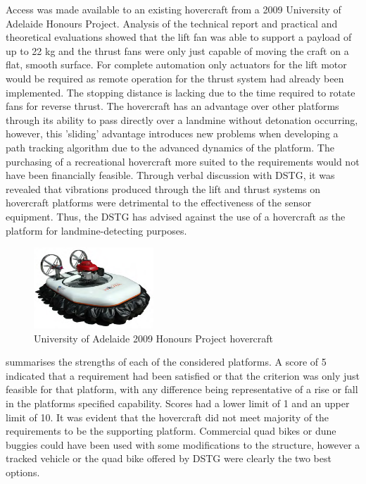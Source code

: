 \documentclass[main.tex]{subfiles}
\begin{document}
Access was made available to an existing hovercraft from a 2009 University of Adelaide Honours Project. Analysis of the technical report \parencite{hovercraft2009} and practical and theoretical evaluations showed that the lift fan was able to support a payload of up to 22 kg and the thrust fans were only just capable of moving the craft on a flat, smooth surface. For complete automation only actuators for the lift motor would be required as remote operation for the thrust system had already been implemented. The stopping distance is lacking due to the time required to rotate fans for reverse thrust. The hovercraft has an advantage over other platforms through its ability to pass directly over a landmine without detonation occurring, however, this 'sliding' advantage introduces new problems when developing a path tracking algorithm due to the advanced dynamics of the platform. The purchasing of a recreational hovercraft more suited to the requirements would not have been financially feasible. Through verbal discussion with DSTG, it was revealed that vibrations produced through the lift and thrust systems on hovercraft platforms were detrimental to the effectiveness of the sensor equipment. Thus, the DSTG has advised against the use of a hovercraft as the platform for landmine-detecting purposes.
\begin{figure}[ht]
\includegraphics[width=0.4\textwidth]{3-ConceptDesign/HovercraftPic.png}
\centering
\caption[University of Adelaide 2009 Honours Project hovercraft]{University of Adelaide 2009 Honours Project hovercraft \parencite{hovercraft2009}} 
\end{figure}

 summarises the strengths of each of the considered platforms. A score of 5 indicated that a requirement had been satisfied or that the criterion was only just feasible for that platform, with any difference being representative of a rise or fall in the platforms specified capability. Scores had a lower limit of 1 and an upper limit of 10. It was evident that the hovercraft did not meet majority of the requirements to be the supporting platform. Commercial quad bikes or dune buggies could have been used with some modifications to the structure, however a tracked vehicle or the quad bike offered by DSTG were clearly the two best options.
\end{document}
